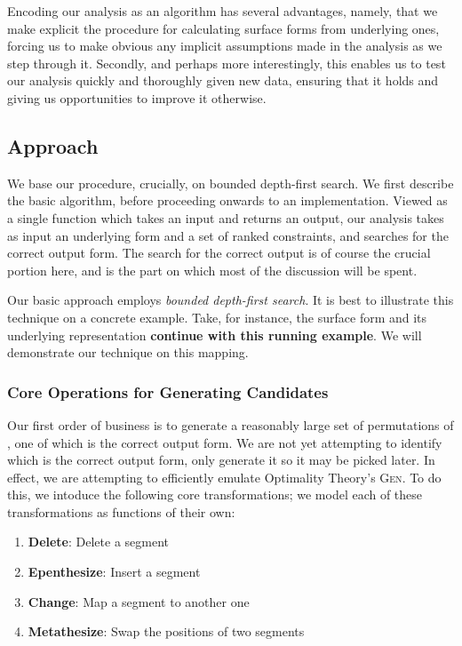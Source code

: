 \documentclass[12pt]{article}
\begin{document}
Encoding our analysis as an algorithm has several advantages, namely, that we
make explicit the procedure for calculating surface forms from underlying ones,
forcing us to make obvious any implicit assumptions made in the analysis as we
step through it. Secondly, and perhaps more interestingly, this enables us to
test our analysis quickly and thoroughly given new data, ensuring that it holds
and giving us opportunities to improve it otherwise.

\subsection{Approach}

We base our procedure, crucially, on bounded depth-first search. We first
describe the basic algorithm, before proceeding onwards to an implementation.
Viewed as a single function which takes an input and returns an output, our
analysis takes as input an underlying form and a set of ranked constraints,
and searches for the correct output form. The search for the correct output
is of course the crucial portion here, and is the part on which most of the
discussion will be spent.

Our basic approach employs \textit{bounded depth-first search}. It is best to
illustrate this technique on a concrete example. Take, for instance, the
surface form \textipa{[sol\'u]} and its underlying representation
 \textbf{continue with this running example}. We will
demonstrate our technique on this mapping.

\subsubsection{Core Operations for Generating Candidates}

Our first order of business is to generate a reasonably large set of
permutations of \textipa{[sol\'u]}, one of which is the correct output form. We
are not yet attempting to identify which is the correct output form, only
generate it so it may be picked later. In effect, we are attempting to
efficiently emulate Optimality Theory's \textsc{Gen}. To do this, we intoduce
the following core transformations; we model each of these transformations as
functions of their own:

\begin{enumerate}
    \item \textbf{Delete}: Delete a segment
    \item \textbf{Epenthesize}: Insert a segment
    \item \textbf{Change}: Map a segment to another one
    \item \textbf{Metathesize}: Swap the positions of two segments
\end{enumerate}
\end{document}
